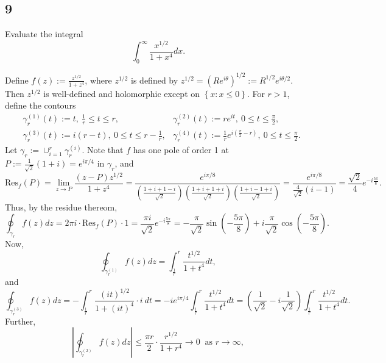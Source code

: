 \documentclass[12pt]{article}
\begin{document}
\subsection*{9}
\begin{tcolorbox}
Evaluate the integral
\[ \int_{0}^{\infty}\frac{x^{1/2}}{1 + x^{4}}dx. \]
\end{tcolorbox}
Define $f(z) := \frac{z^{1/2}}{1 + z^{4}}$, where $z^{1/2}$ is defined by $z^{1/2} = (Re^{i\theta})^{1/2} := R^{1/2}e^{i\theta/2}$. Then $z^{1/2}$ is
well-defined and holomorphic except on $\left\{ x : x \leq 0 \right\}$. For $r > 1$, define the contours 
\begin{align*}
& \gamma_{r}^{(1)}(t) := t,\  \frac{1}{r} \leq t \leq r, & \gamma_{r}^{(2)}(t) := re^{it}, \ 0 \leq t \leq \frac{\pi}{2}, \\
& \gamma_{r}^{(3)}(t) := i(r - t), \ 0\leq t \leq r - \frac{1}{r}, & \gamma_{r}^{(4)}(t) := \frac{1}{r}e^{i\left( \frac{\pi}{2} - r \right)},\  0
\leq t \leq \frac{\pi}{2}.
\end{align*}
Let $\gamma_{r} := \cup_{i=1}^{r}\gamma_{r}^{(i)}$. Note that $f$ has one pole of order 1 at $P := \frac{1}{\sqrt{2}}(1 + i) = e^{i\pi / 4}$ in
$\gamma_{r}$, and 
\[\text{Res}_{f}(P) = \lim_{z\rightarrow P}\frac{(z - P)z^{1/2}}{1 + z^{4}} 
= \frac{e^{i\pi / 8}}{\left( \frac{1 + i + 1 - i}{\sqrt{2}} \right)\left( \frac{1 + i + 1 + i}{\sqrt{2}} \right)\left( \frac{1 + i - 1 + i}{\sqrt{2}} \right)} 
= \frac{e^{i\pi / 8}}{\frac{4}{\sqrt{2}}(i - 1)} = \frac{\sqrt{2}}{4}e^{-i\frac{5\pi}{8}}.\]
Thus, by the residue thereom,
\begin{equation}
\oint_{\gamma_{r}}f(z)dz = 2\pi i \cdot \text{Res}_{f}(P) \cdot 1 = \frac{\pi i}{\sqrt{2}}e^{-i\frac{5\pi}{8}} = -\frac{\pi}{\sqrt{2}}
\sin\left( -\frac{5\pi}{8} \right) + i\frac{\pi}{\sqrt{2}}\cos\left( -\frac{5\pi}{8} \right).
\label{9.1}
\end{equation}
Now,
\begin{equation}
\oint_{\gamma_{r}^{(1)}}f(z)dz = \int_{\frac{1}{r}}^{r}\frac{t^{1/2}}{1 + t^{4}}dt,
\label{9.2}
\end{equation}
and 
\begin{equation}
\oint_{\gamma_{r}^{(3)}}f(z)dz = -\int_{\frac{1}{r}}^{r}\frac{(it)^{1/2}}{1 + (it)^{4}}\cdot i \ dt =
-ie^{i\pi/4}\int_{\frac{1}{r}}^{r}\frac{t^{1/2}}{1 + t^{4}}dt = \left(\frac{1}{\sqrt{2}} -i\frac{1}{\sqrt{2}}\right)\int_{\frac{1}{r}}^{r}\frac{t^{1/2}}{1 + t^{4}}dt. 
\label{9.3}
\end{equation}
Further,
\begin{equation}
\left|\oint_{\gamma_{r}^{(2)}}f(z)dz\right| \leq \frac{\pi r}{2}\cdot \frac{r^{1/2}}{1 + r^{4}} \rightarrow 0 \ \text{ as } r\rightarrow \infty,
\label{9.4}
\end{equation}
\end{document}
